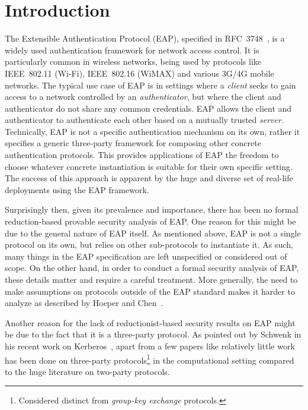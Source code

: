 \section{Introduction}\label{sec:introduction}
The Extensible Authentication Protocol (EAP),
specified in RFC~3748~\cite{IETF:RFC3748:EAP},
is a widely used authentication framework for network access control. 
It is particularly common in wireless networks,
being used by protocols like IEEE~802.11 (Wi-Fi),
IEEE~802.16 (WiMAX) and various 3G/4G mobile networks. 
The typical use case of EAP is in settings where a \emph{client} seeks to gain access to a network controlled by an \emph{authenticator},
but where the client and authenticator do not share any common credentials.
EAP allows the client and authenticator to authenticate each other based on a mutually trusted \emph{server}.
Technically,
EAP is not a specific authentication mechanism on its own,
rather it specifies a generic three-party framework for composing other concrete authentication protocols.
This provides applications of EAP the freedom to choose whatever concrete instantiation is suitable for their own specific setting. 
The success of this approach is apparent by the huge and diverse set of real-life deployments using the EAP framework.

Surprisingly then,
given its prevalence and importance,
there has been no formal reduction-based provable security analysis of EAP.
One reason for this might be due to the general nature of EAP itself.
As mentioned above,
EAP is not a single protocol on its own,
but relies on other sub-protocols to instantiate it.
As such,
many things in the EAP specification are left unspecified or considered out of scope.
On the other hand,
in order to conduct a formal security analysis of EAP,
these details matter and require a careful treatment.
More generally, the need to make assumptions on protocols outside of the EAP standard makes it harder to analyze
as described by Hoeper and Chen~\cite{HoeperC:2007:EAP_claims_fail}.

Another reason for the lack of reductionist-based security results on EAP might be due to the fact that it is a three-party protocol.
As pointed out by Schwenk in his recent work on Kerberos~\cite{EPRINT:Schwenk16},
apart from a few papers like \cite{STOC:BelRog95,PKC:AbdFouPoi05,EPRINT:NCPW14,ACNS:AFMOR16,EPRINT:Schwenk16} relatively little work has been done on three-party protocols\footnote{Considered distinct from \emph{group-key exchange} protocols.} in the computational setting compared to the huge literature on two-party protocols.


